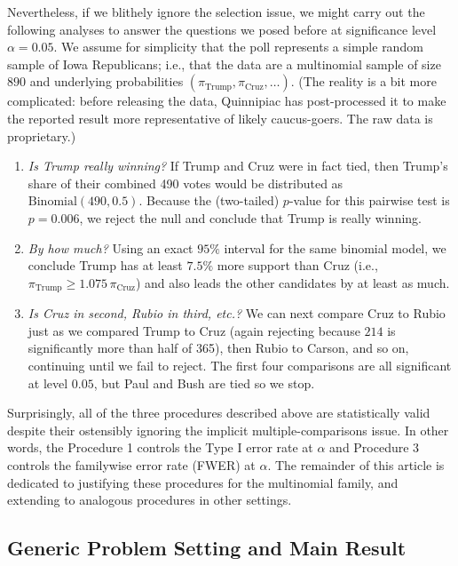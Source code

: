 \documentclass[aos, authoryear]{imsart}
\theoremstyle{definition}
\theoremstyle{custom}
\begin{document}
Nevertheless, if we blithely ignore the selection issue, we might carry out the following analyses to answer the questions we posed before at significance level $\alpha = 0.05$. We assume for simplicity that the poll represents a simple random sample of Iowa Republicans; i.e., that the data are a multinomial sample of size $890$ and underlying probabilities $\left(\pi_{\text{Trump}}, \pi_{\text{Cruz}}, \ldots\right)$. (The reality is a bit more complicated: before releasing the data, Quinnipiac has post-processed it to make the reported result more representative of likely caucus-goers. The raw data is proprietary.)

\begin{enumerate}
\item {\em Is Trump really winning?} If Trump and Cruz were in fact tied, then Trump's share of their combined 490 votes would be distributed as $\text{Binomial}\left(490, 0.5\right)$. Because the (two-tailed) $p$-value for this pairwise test is $p = 0.006$, we reject the null and conclude that Trump is really winning.

\item {\em By how much?} Using an exact $95\%$ interval for the same binomial model, we conclude Trump has at least $7.5\%$ more support than Cruz (i.e., $\pi_{\text{Trump}} \ge 1.075 \,\pi_{\text{Cruz}}$) and also leads the other candidates by at least as much.

\item {\em Is Cruz in second, Rubio in third, etc.?} We can next compare Cruz to Rubio just as we compared Trump to Cruz (again rejecting because $214$ is significantly more than half of 365), then Rubio to Carson, and so on, continuing until we fail to reject. The first four comparisons are all significant at level $0.05$, but Paul and Bush are tied so we stop.
\end{enumerate}

Surprisingly, all of the three procedures described above are statistically valid despite their ostensibly ignoring the implicit multiple-comparisons issue. In other words, the Procedure 1 controls the Type I error rate at $\alpha$ and Procedure 3 controls the familywise error rate (FWER) at $\alpha$. The remainder of this article is dedicated to justifying these procedures for the multinomial family, and extending to analogous procedures in other settings.

\subsection{Generic Problem Setting and Main Result}
\label{sec:probset}
\end{document}
